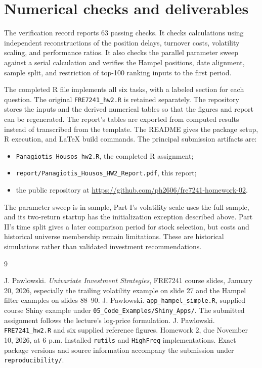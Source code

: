 \documentclass[11pt,letterpaper]{article}
\begin{document}
\section{Numerical checks and deliverables}
The verification record reports 63 passing checks. It checks calculations
using independent reconstructions
of the position delays, turnover costs, volatility scaling, and performance
ratios. It also checks the parallel parameter sweep against a serial
calculation and verifies the Hampel positions, date alignment, sample split,
and restriction of top-100 ranking inputs to the first period.

The completed R file implements all six tasks, with a labeled section for
each question. The original \texttt{FRE7241\_hw2.R} is retained separately.
The repository stores the inputs and the derived numerical
tables so that the figures and report can be regenerated. The report's
tables are exported from computed results instead of transcribed from the
template. The README gives the package setup, R execution, and LaTeX build
commands. The principal submission artifacts are:
\begin{itemize}
\item \texttt{Panagiotis\_Housos\_hw2.R}, the completed R assignment;
\item \texttt{report/Panagiotis\_Housos\_HW2\_Report.pdf}, this report;
\item the public repository at
\url{https://github.com/ph2606/fre7241-homework-02}.
\end{itemize}

The parameter sweep is in sample, Part I's volatility scale uses the
full sample, and its two-return startup has the initialization exception
described above. Part II's time split gives a later comparison period for
stock selection, but costs and historical universe membership remain limitations.
These are historical simulations rather than validated investment
recommendations.

\begin{thebibliography}{9}
\raggedright
{} J. Pawlowski. \emph{Univariate Investment Strategies},
FRE7241 course slides, January 20, 2026, especially the trailing volatility
example on slide 27 and the Hampel filter examples on slides 88--90.
 J. Pawlowski. \texttt{app\_hampel\_simple.R}, supplied course
Shiny example under \texttt{05\_Code\_Examples/Shiny\_Apps/}. The submitted
assignment follows the lecture's log-price formulation.
 J. Pawlowski. \texttt{FRE7241\_hw2.R} and six supplied
reference figures. Homework 2, due November 10, 2026, at 6 p.m.
 Installed \texttt{rutils} and \texttt{HighFreq}
implementations. Exact package versions and source information accompany
the submission under \texttt{reproducibility/}.
\end{thebibliography}
\end{document}
